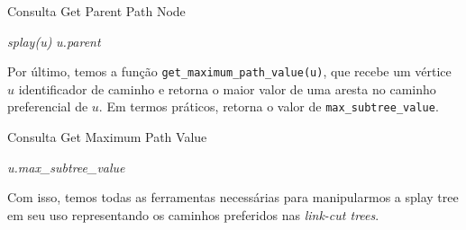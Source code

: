 \begin{algorithm}[h!]
    \caption{Consulta Get Parent Path Node}\label{splay:get-parent-path}
    \begin{algorithmic}[1]
        \State \emph{splay(u)}
        \State \Return \emph{u.parent}
        \EndFunction
    \end{algorithmic}
\end{algorithm}

Por último, temos a função \texttt{get\_maximum\_path\_value(u)}, que recebe um vértice $u$ identificador de caminho e retorna o maior valor de uma aresta no caminho preferencial de $u$. Em termos práticos, retorna o valor de \texttt{max\_subtree\_value}.

\begin{algorithm}[h!]
    \caption{Consulta Get Maximum Path Value}\label{splay:get-maximum-value}
    \begin{algorithmic}[1]
        \State \Return \emph{u.max\_subtree\_value}
        \EndFunction
    \end{algorithmic}
\end{algorithm}

Com isso, temos todas as ferramentas necessárias para manipularmos a splay tree em seu uso representando os caminhos preferidos nas \emph{link-cut trees}.